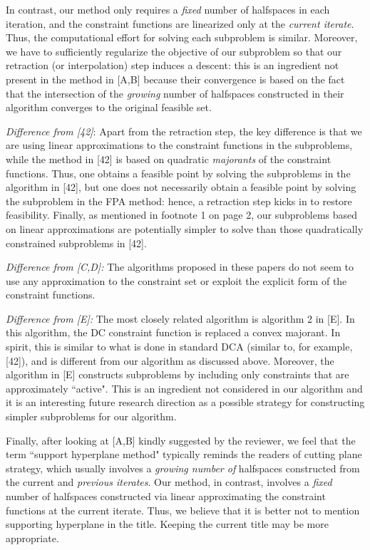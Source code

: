 \documentclass{article}
\begin{document}
\begin{enumerate}
    In contrast, our method only requires a {\it fixed} number of halfspaces in each iteration, and the constraint functions are linearized only at the \emph{current iterate}. Thus, the computational effort for solving each subproblem is similar. Moreover, we have to sufficiently regularize the objective of our subproblem so that our retraction (or interpolation) step induces a descent: this is an ingredient not present in the method in [A,B] because their convergence is based on the fact that the intersection of the \emph{growing} number of halfspaces constructed in their algorithm converges to the original feasible set.

    {\it Difference from [42]}: Apart from the retraction step, the key difference is that we are using linear approximations to the constraint functions in the subproblems, while the method in [42] is based on quadratic \emph{majorants} of the constraint functions. Thus, one obtains a feasible point by solving the subproblems in the algorithm in [42], but one does not necessarily obtain a feasible point by solving the subproblem in the FPA method: hence, a retraction step kicks in to restore feasibility. Finally, as mentioned in footnote 1 on page 2, our subproblems based on linear approximations are potentially simpler to solve than those quadratically constrained subproblems in [42].

    {\it Difference from [C,D]:} The algorithms proposed in these papers do not seem to use any approximation to the constraint set or exploit the explicit form of the constraint functions.

    {\it Difference from [E]:} The most closely related algorithm is algorithm 2 in [E]. In this algorithm, the DC constraint function is replaced a convex majorant. In spirit, this is similar to what is done in standard DCA (similar to, for example, [42]), and is different from our algorithm as discussed above. Moreover, the algorithm in [E] constructs subproblems by including only constraints that are approximately ``active". This is an ingredient not considered in our algorithm and it is an interesting future research direction as a possible strategy for constructing simpler subproblems for our algorithm.

    Finally, after looking at [A,B] kindly suggested by the reviewer, we feel that the term ``support hyperplane method" typically reminds the readers of cutting plane strategy, which usually involves a {\em growing number of} halfspaces constructed from the current and {\em previous iterates}. Our method, in contrast, involves a {\em fixed} number of halfspaces constructed via linear approximating the constraint functions at the current iterate. Thus, we believe that it is better not to mention supporting hyperplane in the title. Keeping the current title may be more appropriate.


\end{enumerate}
\end{document}
